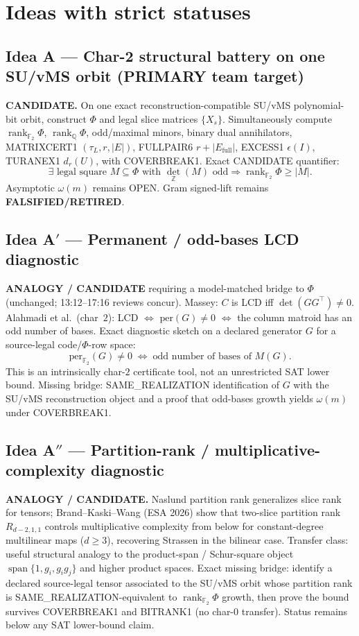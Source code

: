 \documentclass[11pt]{article}
\begin{document}
\section*{Ideas with strict statuses}
\subsection*{Idea A --- Char-2 structural battery on one SU/vMS orbit (PRIMARY team target)}
\textbf{CANDIDATE.} On one exact reconstruction-compatible SU/vMS polynomial-bit
orbit, construct $\Phi$ and legal slice matrices $\{X_s\}$. Simultaneously compute
$\operatorname{rank}_{\mathbb F_2}\Phi$, $\operatorname{rank}_{\mathbb Q}\Phi$,
odd/maximal minors, binary dual annihilators, MATRIXCERT1 $(\tau_L,r,|E|)$,
FULLPAIR6 $r+|E_{\mathrm{full}}|$, EXCESS1 $\epsilon(I)$, TURANEX1 $d_r(U)$, with
COVERBREAK1. Exact CANDIDATE quantifier:
\[
\exists\text{ legal square }M\subseteq\Phi\text{ with }\det_{\mathbb Z}(M)\text{ odd}
\Rightarrow\operatorname{rank}_{\mathbb F_2}\Phi\ge|M|.
\]
Asymptotic $\omega(m)$ remains OPEN. Gram signed-lift remains
\textbf{FALSIFIED/RETIRED}.

\subsection*{Idea A$'$ --- Permanent / odd-bases LCD diagnostic}
\textbf{ANALOGY / CANDIDATE} requiring a model-matched bridge to $\Phi$ (unchanged;
13:12--17:16 reviews concur). Massey: $C$ is LCD iff $\det(GG^\top)\neq 0$.
Alahmadi et al.\ (char~$2$): LCD $\Leftrightarrow$ $\mathrm{per}(G)\neq 0$
$\Leftrightarrow$ the column matroid has an odd number of bases. Exact diagnostic
sketch on a declared generator $G$ for a source-legal code/$\Phi$-row space:
\[
\mathrm{per}_{\mathbb F_2}(G)\neq 0\;\Leftrightarrow\;\text{odd number of bases of }M(G).
\]
This is an intrinsically char-$2$ certificate tool, not an unrestricted SAT lower
bound. Missing bridge: SAME\_REALIZATION identification of $G$ with the SU/vMS
reconstruction object and a proof that odd-bases growth yields $\omega(m)$ under
COVERBREAK1.

\subsection*{Idea A$''$ --- Partition-rank / multiplicative-complexity diagnostic}
\textbf{ANALOGY / CANDIDATE.} Naslund partition rank generalizes slice rank for
tensors; Brand--Kaski--Wang (ESA 2026) show that two-slice partition rank
$R_{d-2,1,1}$ controls multiplicative complexity from below for constant-degree
multilinear maps ($d\ge 3$), recovering Strassen in the bilinear case. Transfer
class: useful structural analogy to the product-span / Schur-square object
$\operatorname{span}\{1,g_i,g_ig_j\}$ and higher product spaces. Exact missing
bridge: identify a declared source-legal tensor associated to the SU/vMS orbit
whose partition rank is SAME\_REALIZATION-equivalent to
$\operatorname{rank}_{\mathbb F_2}\Phi$ growth, then prove the bound survives
COVERBREAK1 and BITRANK1 (no char-$0$ transfer). Status remains below any SAT
lower-bound claim.
\end{document}
